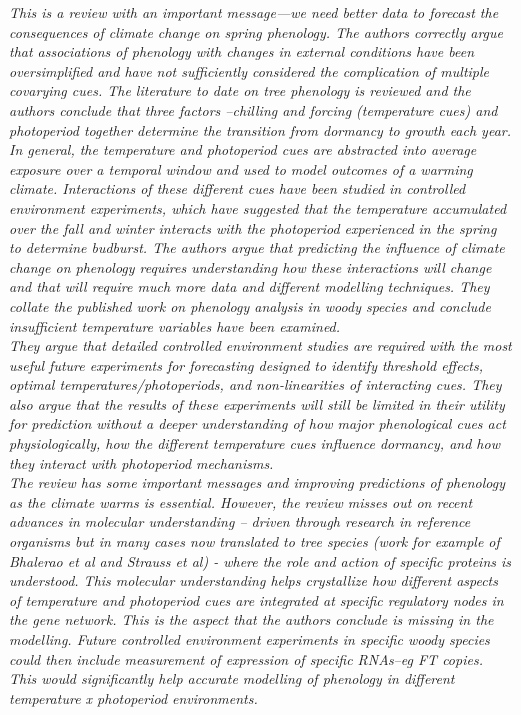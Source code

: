 \documentclass[11pt,letter]{article}
\begin{document}
\emph{This is a review with an important message---we need better data to forecast the consequences of climate change on spring phenology. The authors correctly argue that associations of phenology with changes in external conditions have been oversimplified and have not sufficiently considered the complication of multiple covarying cues. The literature to date on tree phenology is reviewed and the authors conclude that three factors –chilling and forcing (temperature cues) and photoperiod together determine the transition from dormancy to growth each year. In general, the temperature and photoperiod cues are abstracted into average exposure over a temporal window and used to model outcomes of a warming climate. Interactions of these different cues have been studied in controlled environment experiments, which have suggested that the temperature accumulated over the fall and winter interacts with the photoperiod experienced in the spring to determine budburst. The authors argue that predicting the influence of climate change on phenology requires understanding how these interactions will change and that will require much more data and different modelling techniques. They collate the published work on phenology analysis in woody species and conclude insufficient temperature variables have been examined.}\\

\emph{They argue that detailed controlled environment studies are required with the most useful future experiments for forecasting designed to identify threshold effects, optimal temperatures/photoperiods, and non-linearities of interacting cues. They also argue that the results of these experiments will still be limited in their utility for prediction without a deeper understanding of how major phenological cues act physiologically, how the different temperature cues influence dormancy, and how they interact with photoperiod mechanisms.}\\

\emph{The review has some important messages and improving predictions of phenology as the climate warms is essential. However, the review misses out on recent advances in molecular understanding – driven through research in reference organisms but in many cases now translated to tree species (work for example of Bhalerao et al and Strauss et al) - where the role and action of specific proteins is understood. This molecular understanding helps crystallize how different aspects of temperature and photoperiod cues are integrated at specific regulatory nodes in the gene network. This is the aspect that the authors conclude is missing in the modelling. Future controlled environment experiments in specific woody species could then include measurement of expression of specific RNAs--eg FT copies. This would significantly help accurate modelling of phenology in different temperature x photoperiod environments.}\\
\end{document}
